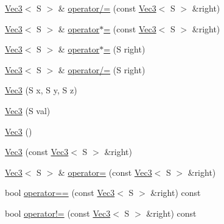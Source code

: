 \begin{DoxyCompactItemize}
\item 
\hyperlink{classmath_1_1_vec3}{Vec3}$<$ S $>$ \& \hyperlink{classmath_1_1_vec3_a870bc06ba74c497da633b3801ebaea0d}{operator/=} (const \hyperlink{classmath_1_1_vec3}{Vec3}$<$ S $>$ \&right)
\item 
\hyperlink{classmath_1_1_vec3}{Vec3}$<$ S $>$ \& \hyperlink{classmath_1_1_vec3_a849a0602d155721bd4ab79edc83c5e57}{operator$\ast$=} (const \hyperlink{classmath_1_1_vec3}{Vec3}$<$ S $>$ \&right)
\item 
\hyperlink{classmath_1_1_vec3}{Vec3}$<$ S $>$ \& \hyperlink{classmath_1_1_vec3_af54d3d2a6b077d8b70a8b1b71d9f6212}{operator$\ast$=} (S right)
\item 
\hyperlink{classmath_1_1_vec3}{Vec3}$<$ S $>$ \& \hyperlink{classmath_1_1_vec3_af25a74b600edcac72bc64c6316ea3252}{operator/=} (S right)
\item 
\hyperlink{classmath_1_1_vec3_a1acc8b1b1c73c5a3d1f0c60e8e23eba3}{Vec3} (S x, S y, S z)
\item 
\hyperlink{classmath_1_1_vec3_ab09aedfee5f79e9b556cc7dca8d5d011}{Vec3} (S val)
\item 
\hyperlink{classmath_1_1_vec3_a0eaf2f3a472502f1374a7f1118d7e459}{Vec3} ()
\item 
\hyperlink{classmath_1_1_vec3_a02c4f66911fc141e48d521a9a6cd9de4}{Vec3} (const \hyperlink{classmath_1_1_vec3}{Vec3}$<$ S $>$ \&right)
\item 
\hyperlink{classmath_1_1_vec3}{Vec3}$<$ S $>$ \& \hyperlink{classmath_1_1_vec3_abcc60135e1b3f3c66e89d502f5895f41}{operator=} (const \hyperlink{classmath_1_1_vec3}{Vec3}$<$ S $>$ \&right)
\item 
bool \hyperlink{classmath_1_1_vec3_a7d6020565ceec5656b4d5880c8a79a65}{operator==} (const \hyperlink{classmath_1_1_vec3}{Vec3}$<$ S $>$ \&right) const
\item 
bool \hyperlink{classmath_1_1_vec3_a98bca9bbb2161b89cf657bb6f7ae0699}{operator!=} (const \hyperlink{classmath_1_1_vec3}{Vec3}$<$ S $>$ \&right) const
\end{DoxyCompactItemize}
